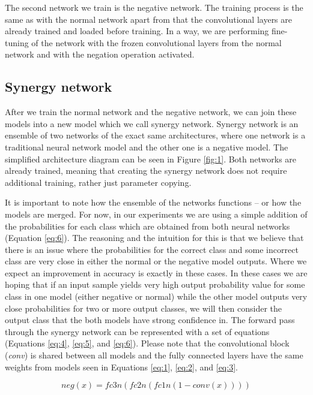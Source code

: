 \documentclass[b5paper]{book}
\begin{document}
The second network we train is the negative network. The training process is the same as with the normal network apart from that the convolutional layers are already trained and loaded before training. In a way, we are performing fine-tuning of the network with the frozen convolutional layers from the normal network and with the negation operation activated. 
\subsection{Synergy network}
\label{synergy}

After we train the normal network and the negative network, we can join these models into a new model which we call synergy network. Synergy network is an ensemble of two networks of the exact same architectures, where one network is a traditional neural network model and the other one is a negative model. The simplified architecture diagram can be seen in Figure \ref{fig:1}. Both networks are already trained, meaning that creating the synergy network does not require additional training, rather just parameter copying. 

It is important to note how the ensemble of the networks functions -- or how the models are merged. For now, in our experiments we are using a simple addition of the probabilities for each class which are obtained from both neural networks (Equation \ref{eq:6}). The reasoning and the intuition for this is that we believe that there is an issue where the probabilities for the correct class and some incorrect class are very close in either the normal or the negative model outputs. Where we expect an improvement in accuracy is exactly in these cases. In these cases we are hoping that if an input sample yields very high output probability value for some class in one model (either negative or normal) while the other model outputs very close probabilities for two or more output classes, we will then consider the output class that the both models have strong confidence in. The forward pass through the synergy network can be represented with a set of equations (Equations \ref{eq:4}, \ref{eq:5}, and \ref{eq:6}). Please note that the convolutional block (\emph{conv}) is shared between all models and the fully connected layers have the same weights from models seen in Equations \ref{eq:1}, \ref{eq:2}, and \ref{eq:3}.

\begin{equation}\label{eq:4}
neg(x) = fc3n(fc2n(fc1n(1 - conv(x))))
\end{equation}
\end{document}
